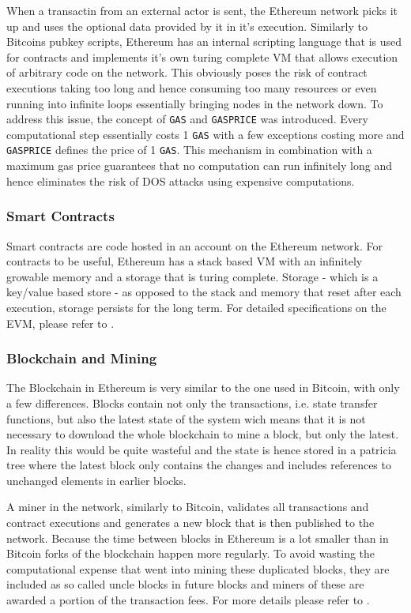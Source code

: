 \documentclass[12pt,msc,a4paper,oneside]{ucl_thesis}
\begin{document}
When a transactin from an external actor is sent, the Ethereum network picks it up and uses the optional data provided by it in it's execution. Similarly to Bitcoins pubkey scripts, Ethereum has an internal scripting language that is used for contracts and implements it's own turing complete VM that allows execution of arbitrary code on the network. This obviously poses the risk of contract executions taking too long and hence consuming too many resources or even running into infinite loops essentially bringing nodes in the network down. To address this issue, the concept of \texttt{GAS} and \texttt{GASPRICE} was introduced. Every computational step essentially costs 1 \texttt{GAS} with a few exceptions costing more and \texttt{GASPRICE} defines the price of 1 \texttt{GAS}. This mechanism in combination with a maximum gas price guarantees that no computation can run infinitely long and hence eliminates the risk of DOS attacks using expensive computations.

\subsubsection{Smart Contracts}
Smart contracts are code hosted in an account on the Ethereum network. For contracts to be useful, Ethereum has a stack based VM with an infinitely growable memory and a storage that is turing complete. Storage - which is a key/value based store - as opposed to the stack and memory that reset after each execution, storage persists for the long term. For detailed specifications on the EVM, please refer to \cite{ethereum:gavin_wood}.

\subsubsection{Blockchain and Mining}
The Blockchain in Ethereum is very similar to the one used in Bitcoin, with only a few differences. Blocks contain not only the transactions, i.e. state transfer functions, but also the latest state of the system wich means that it is not necessary to download the whole blockchain to mine a block, but only the latest. In reality this would be quite wasteful and the state is hence stored in a patricia tree where the latest block only contains the changes and includes references to unchanged elements in earlier blocks. 

A miner in the network, similarly to Bitcoin, validates all transactions and contract executions and generates a new block that is then published to the network. Because the time between blocks in Ethereum is a lot smaller than in Bitcoin forks of the blockchain happen more regularly. To avoid wasting the computational expense that went into mining these duplicated blocks, they are included as so called uncle blocks in future blocks and miners of these are awarded a portion of the transaction fees. For more details please refer to \cite{ethereum:gavin_wood}.
\end{document}
